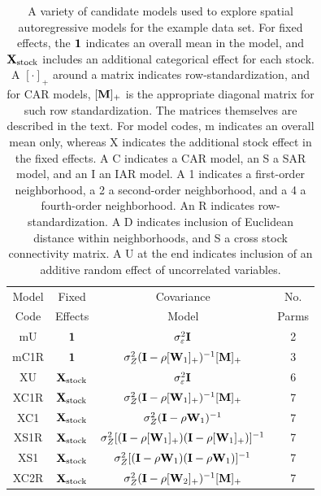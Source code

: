 \documentclass[11pt, titlepage]{article}\usepackage[]{graphicx}\usepackage[]{color}
\begin{document}

\begin{table}[ht]
	\caption{A variety of candidate models used to explore spatial autoregressive models for the example data set.  For fixed effects, the $\mathbf{1}$ indicates an overall mean in the model, and $\mathbf{X}_\textrm{stock}$ includes an additional categorical effect for each stock.  A $[\cdot]_+$ around a matrix indicates row-standardization, and for CAR models, $[\mathbf{M}]_+$ is the appropriate diagonal matrix for such row standardization. The matrices themselves are described in the text. For model codes, m indicates an overall mean only, whereas X indicates the additional stock effect in the fixed effects.  A C indicates a CAR model, an S a SAR model, and an I an IAR model.  A 1 indicates a first-order neighborhood, a 2 a second-order neighborhood, and a 4 a fourth-order neighborhood.  An R indicates row-standardization.  A D indicates inclusion of Euclidean distance within neighborhoods, and S a cross stock connectivity matrix.  A U at the end indicates inclusion of an additive random effect of uncorrelated variables.  \label{Tab:Models}}
\begin{center}
\begin{tabular}{c|c|c|c}
  \hline
  \hline
  Model & Fixed & Covariance & No. \\ 
  Code & Effects & Model & Parms \\
  \hline
  mU & $\mathbf{1}$ & $\sigma_\varepsilon^2\mathbf{I}$ & 2 \\
  mC1R & $\mathbf{1}$ & $\sigma_Z^2(\mathbf{I} - \rho[\mathbf{W}_1]_+)^{-1}[\mathbf{M}]_+$ & 3 \\
  XU & $\mathbf{X}_{\textrm{stock}}$ & $\sigma_\varepsilon^2\mathbf{I}$ & 6 \\
  XC1R & $\mathbf{X}_{\textrm{stock}}$ & $\sigma_Z^2(\mathbf{I} - \rho[\mathbf{W}_1]_+)^{-1}[\mathbf{M}]_+$ & 7 \\
  XC1 & $\mathbf{X}_{\textrm{stock}}$ & $\sigma_Z^2(\mathbf{I} - \rho\mathbf{W}_1)^{-1}$ & 7 \\
  XS1R & $\mathbf{X}_{\textrm{stock}}$ & $\sigma_Z^2[(\mathbf{I} - \rho[\mathbf{W}_1]_+)(\mathbf{I} - \rho[\mathbf{W}_1]_+)]^{-1}$ & 7 \\
  XS1 & $\mathbf{X}_{\textrm{stock}}$ & $\sigma_Z^2[(\mathbf{I} - \rho\mathbf{W}_{1})(\mathbf{I} - \rho\mathbf{W}_{1})]^{-1}$ & 7 \\
  XC2R & $\mathbf{X}_{\textrm{stock}}$ & $\sigma_Z^2(\mathbf{I} - \rho[\mathbf{W}_2]_+)^{-1}[\mathbf{M}]_+$ & 7 \\

\end{tabular}
\end{center}
\end{table}
\end{document}
